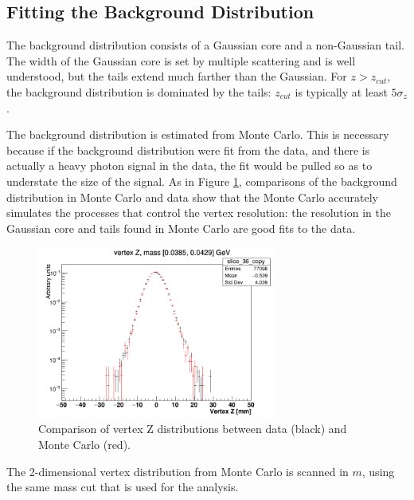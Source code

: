 \clearpage
\subsection{Fitting the Background Distribution}
\label{sec:tails}
The background distribution consists of a Gaussian core and a non-Gaussian tail.
The width of the Gaussian core is set by multiple scattering and is well understood, but the tails extend much farther than the Gaussian.
For $z>z_{cut}$, the background distribution is dominated by the tails: $z_{cut}$ is typically at least $5\sigma_z$.

The background distribution is estimated from Monte Carlo.
This is necessary because if the background distribution were fit from the data, and there is actually a heavy photon signal in the data, the fit would be pulled so as to understate the size of the signal.
As in Figure \ref{fig:vertex_data-mc}, comparisons of the background distribution in Monte Carlo and data show that the Monte Carlo accurately simulates the processes that control the vertex resolution: the resolution in the Gaussian core and tails found in Monte Carlo are good fits to the data.

\begin{figure}[ht]
\begin{center}
    \includegraphics[width=0.7\textwidth]{vertexing/figs/slice-36}
\end{center}
\caption{Comparison of vertex Z distributions between data (black) and Monte Carlo (red).}
    \label{fig:vertex_data-mc}
\end{figure}

The 2-dimensional vertex distribution from Monte Carlo is scanned in $m$, using the same mass cut that is used for the analysis.

